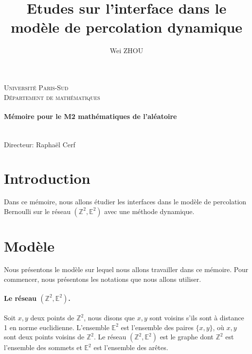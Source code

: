 \documentclass[titlepage,a4paper,12pt]{article}
\title{Etudes sur l'interface dans le modèle de percolation dynamique}
\author{Wei ZHOU}
\begin{document}
\makeatletter
  \begin{titlepage}
  \centering
      {\large \textsc{Université Paris-Sud}}\\
      \textsc{Département de mathématiques}\\
      {\large\textbf{	\@date\\
       Mémoire pour le M2 mathématiques de l'aléatoire}}\\
    \vfill
       {\LARGE \textbf{\@title}} \\
    \vspace{2em}
        {\large \@author} \\
    \vspace{2em}
    		{\large Directeur: Raphaël Cerf}
    \vfill
  \end{titlepage}
\makeatother

\tableofcontents

\newpage
\section{Introduction}
Dans ce mémoire, nous allons étudier les interfaces dans le modèle de percolation Bernoulli sur le réseau $(\mathbb{Z}^2,\mathbb{E}^2)$ avec une méthode dynamique.

\section{Modèle}
Nous présentons le modèle sur lequel nous allons travailler dans ce mémoire. Pour commencer, nous présentons les notations que nous allons utiliser.

\paragraph{Le réseau $(\mathbb{Z}^2,\mathbb{E}^2)$.} Soit $x,y$ deux points de $\mathbb{Z}^2$, nous disons que $x,y$ sont voisins s'ils sont à distance 1 en norme euclidienne. L'ensemble $\mathbb{E}^2$ est l'ensemble des paires $\{x,y\}$, où $x,y$ sont deux points voisins de $\mathbb{Z}^2$. Le réseau $(\mathbb{Z}^2, \mathbb{E}^2)$ est le graphe dont $\mathbb{Z}^2$ est l'ensemble des sommets et $\mathbb{E}^2$ est l'ensemble des arêtes.
\end{document}

